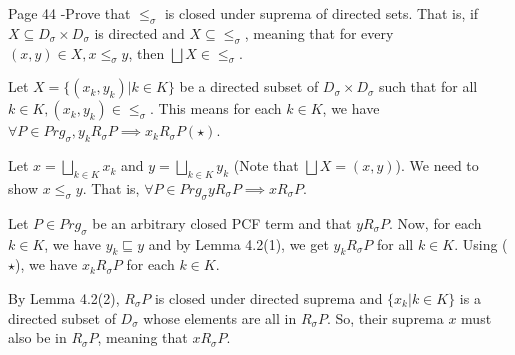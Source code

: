 \begin{problem}{Page 44}
-Prove that $\leq_\sigma$ is closed under suprema of directed sets. That is, if 
$X \subseteq D_\sigma \times D_\sigma$ is directed and $X \subseteq \leq_\sigma$, meaning that for every $(x,y) \in X, x \leq_\sigma y$, then $\bigsqcup X \in \leq_\sigma$.
\end{problem}



\begin{solution}
    Let $X = \{ (x_k, y_k) | k \in K \}$ be a directed subset of $D_\sigma \times D_\sigma$ such that for all $k \in K, (x_k, y_k) \in \leq_\sigma$.
This means for each $k \in K$, we have $\forall P \in Prg_\sigma, y_k R_\sigma P \implies x_k R_\sigma P (\star)$.

Let $x = \bigsqcup_{k \in K} x_k$ and $y = \bigsqcup_{k \in K} y_k$ (Note that $\bigsqcup X = (x,y)$). We need to show $x \leq_\sigma y$. That is, $\forall P \in Prg_\sigma y R_\sigma P \implies x R_\sigma P$.

Let $P \in Prg_\sigma$ be an arbitrary closed PCF term and that $y R_\sigma P$. 
Now, for each $k \in K$, we have $y_k \sqsubseteq y$ and by Lemma 4.2(1), we get $y_k R_\sigma P$ for all $k \in K$. Using ($\star$), we have $x_k R_\sigma P$ for each $k \in K$. 

By Lemma 4.2(2), $R_\sigma P$ is closed under directed suprema and $\{ x_k | k \in K \}$ is a directed subset of $D_\sigma$ whose elements are all in $R_\sigma P$. So, their suprema $x$ must also be in $R_\sigma P$, meaning that $x R_\sigma P$.
\end{solution}